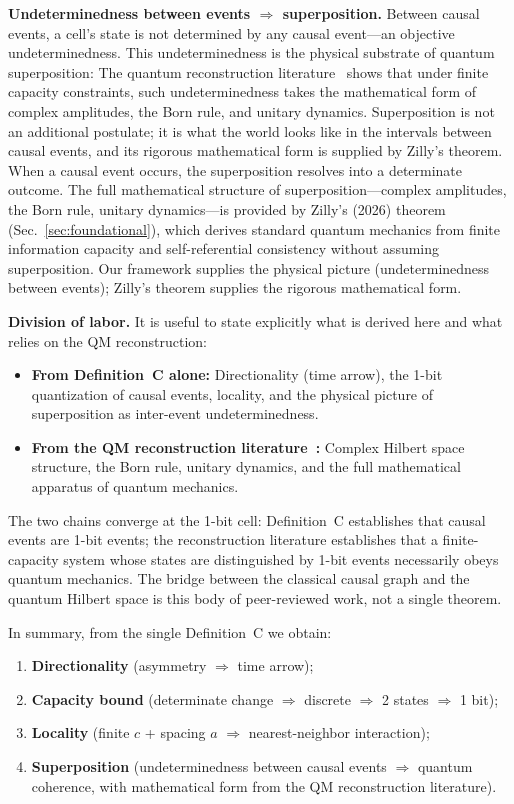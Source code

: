 \documentclass[aps,prd,twocolumn,showpacs,superscriptaddress,preprintnumbers]{revtex4-2}
\begin{document}
\textbf{Undeterminedness between events $\Rightarrow$ superposition.}
Between causal events, a cell's state is not determined by any causal event---an objective undeterminedness. This undeterminedness is the physical substrate of quantum superposition: The quantum reconstruction literature~\cite{Zeilinger1999,Dakic2011,Chiribella2011,Masanes2011,Shaghaghi2023,Zilly:2026} shows that under finite capacity constraints, such undeterminedness takes the mathematical form of complex amplitudes, the Born rule, and unitary dynamics. Superposition is not an additional postulate; it is what the world looks like in the intervals between causal events, and its rigorous mathematical form is supplied by Zilly's theorem. When a causal event occurs, the superposition resolves into a determinate outcome. The full mathematical structure of superposition---complex amplitudes, the Born rule, unitary dynamics---is provided by Zilly's (2026) theorem (Sec.~\ref{sec:foundational}), which derives standard quantum mechanics from finite information capacity and self-referential consistency without assuming superposition. Our framework supplies the physical picture (undeterminedness between events); Zilly's theorem supplies the rigorous mathematical form.

\textbf{Division of labor.}
It is useful to state explicitly what is derived here and what relies on the QM reconstruction:
\begin{itemize}
    \item \textbf{From Definition~C alone:} Directionality (time arrow), the 1-bit quantization of causal events, locality, and the physical picture of superposition as inter-event undeterminedness.
    \item \textbf{From the QM reconstruction literature~\cite{Zeilinger1999,Dakic2011,Chiribella2011,Masanes2011,Shaghaghi2023,Zilly:2026}:} Complex Hilbert space structure, the Born rule, unitary dynamics, and the full mathematical apparatus of quantum mechanics.
\end{itemize}
The two chains converge at the 1-bit cell: Definition~C establishes that causal events are 1-bit events; the reconstruction literature establishes that a finite-capacity system whose states are distinguished by 1-bit events necessarily obeys quantum mechanics. The bridge between the classical causal graph and the quantum Hilbert space is this body of peer-reviewed work, not a single theorem.

In summary, from the single Definition~C we obtain:
\begin{enumerate}
    \item \textbf{Directionality} (asymmetry $\Rightarrow$ time arrow);
    \item \textbf{Capacity bound} (determinate change $\Rightarrow$ discrete $\Rightarrow$ 2 states $\Rightarrow$ 1 bit);
    \item \textbf{Locality} (finite $c$ + spacing $a$ $\Rightarrow$ nearest-neighbor interaction);
    \item \textbf{Superposition} (undeterminedness between causal events $\Rightarrow$ quantum coherence, with mathematical form from the QM reconstruction literature).
\end{enumerate}
\end{document}
